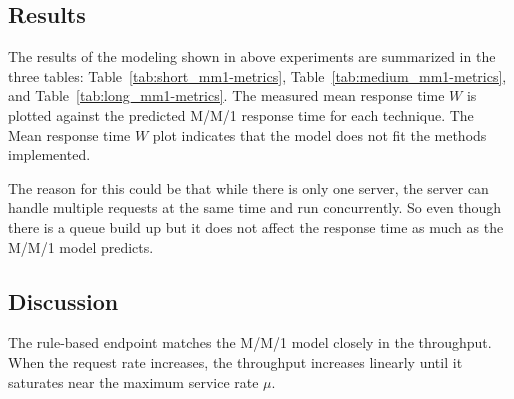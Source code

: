 \documentclass[
	english,
	accentcolor=9c,
	type=intern,
	marginpar=false,
	11pt
]{tudapub}
\begin{document}
\subsection{Results}

The results of the modeling shown in above experiments are summarized in the three tables: Table~\ref{tab:short_mm1-metrics}, Table~\ref{tab:medium_mm1-metrics}, and Table~\ref{tab:long_mm1-metrics}.
The measured mean response time \(W\) is plotted against the predicted M/M/1 response time for each technique.
The Mean response time \(W\) plot indicates that the model does not fit the methods implemented.

The reason for this could be that while there is only one server, the server can handle multiple requests at the same time and run concurrently.
So even though there is a queue build up but it does not affect the response time as much as the M/M/1 model predicts.


% 




\subsection{Discussion}

The rule-based endpoint matches the M/M/1 model closely in the throughput. 
When the request rate increases, the throughput increases linearly until it saturates near the maximum service rate \(\mu\).
\end{document}
